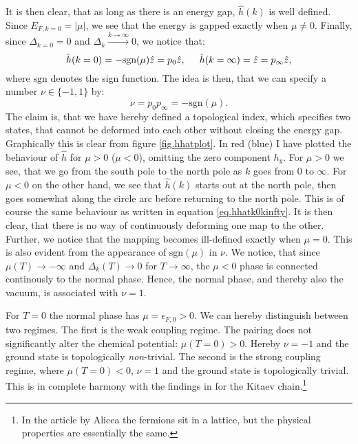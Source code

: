 It is then clear, that as long as there is an energy gap, $\hat{h}(k)$ is well defined. Since $E_{F,k=0} = |\mu|$, we see that the energy is gapped exactly when $\mu \neq 0$. Finally, since $\Delta_{k=0} = 0$ and $\Delta_k \overset{k\to \infty}{\to} 0$, we notice that: 
\begin{equation}
\hat{h}(k=0) = -\text{sgn}(\mu)\hat{z} = p_0\hat{z}, \hspace{0.5cm} \hat{h}(k=\infty) = \hat{z} = p_{\infty}\hat{z},
\label{eq.hhatk0kinfty}
\end{equation}
where $\text{sgn}$ denotes the sign function. The idea is then, that we can specify a number $\nu \in \{-1,1\}$ by:
\begin{equation}
\nu = p_0p_{\infty} = -\text{sgn}(\mu).
\label{eq.topinvnudefition}
\end{equation}
The claim is, that we have hereby defined a topological index, which specifies two states, that cannot be deformed into each other without closing the energy gap. Graphically this is clear from figure \ref{fig.hhatplot}. In red (blue) I have plotted the behaviour of $\hat{h}$ for $\mu > 0$ ($\mu < 0$), omitting the zero component $h_y$. For $\mu > 0$ we see, that we go from the south pole to the north pole as $k$ goes from $0$ to $\infty$. For $\mu < 0$ on the other hand, we see that $\hat{h}(k)$ starts out at the north pole, then goes somewhat along the circle arc before returning to the north pole. This is of course the same behaviour as written in equation \eqref{eq.hhatk0kinfty}. It is then clear, that there is no way of continuously deforming one map to the other. Further, we notice that the mapping becomes ill-defined exactly when $\mu = 0$. This is also evident from the appearance of $\text{sgn}(\mu)$ in $\nu$. We notice, that since $\mu(T) \to -\infty$ and $\Delta_k(T)\to 0$ for $T\to \infty$, the $\mu < 0$ phase is connected continously to the normal phase. Hence, the normal phase, and thereby also the vacuum, is associated with $\nu = 1$. 

For $T = 0$ the normal phase has $\mu = \epsilon_{F,0} > 0$. We can hereby distinguish between two regimes. The first is the weak coupling regime. The pairing does not significantly alter the chemical potential: $\mu(T=0) > 0$. Hereby $\nu = -1$ and the ground state is topologically \textit{non}-trivial. The second is the strong coupling regime, where $\mu(T = 0) < 0$, $\nu = 1$ and the ground state is topologically trivial. This is in complete harmony with the findings in \cite{Alicea} for the Kitaev chain.\footnote{In the article by Alicea the fermions sit in a lattice, but the physical properties are essentially the same.}

